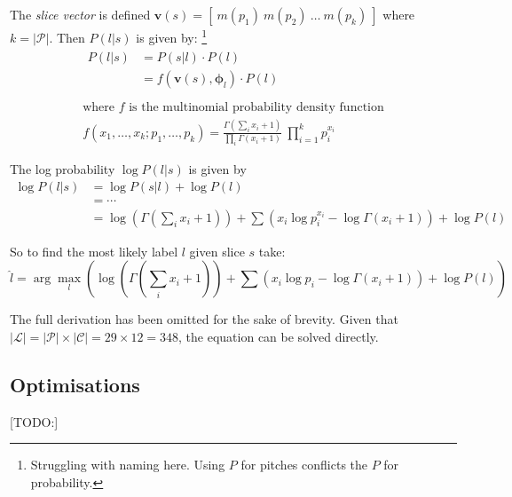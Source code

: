 \documentclass[12pt,a4paper,twoside,openany]{report} \usepackage[pdfborder={0 0 0}]{hyperref}    %
\theoremstyle{definition} \newtheorem{definition}{Definition}[section]
\begin{document}
      The \textit{slice vector} is defined $\bm{v}(s) = \left[~m(p_1)~ m(p_2)~\dots~m(p_{k})~\right]$ where $k
      = |\mathcal{P}|$. Then $P(l|s)$ is given by: \footnote{Struggling with naming here. Using $P$ for pitches
      conflicts the $P$ for probability.  } \begin{equation} \begin{gathered} \begin{aligned} P(l|s) &= P(s|l)\cdot P(l)
      \\ &= f(\bm{v}(s), \bm{\phi}_l)\cdot P(l) \\ \end{aligned} \\ \text{where $f$ is the multinomial probability
    density function} \\ f(x_1, \dots, x_k;p_1, \dots, p_k) = \frac{\Gamma \left(\sum\limits_{i} x_i
  + 1 \right)}{\prod\limits_{i} \Gamma \left(x_i + 1\right)}~\prod\limits_{i=1}^{k} p_{i}^{x_i} \end{gathered}
\label{eq:labelgivenchordtones} \end{equation}

The log probability $\log P(l|s)$ is given by \begin{equation} \begin{aligned} \log P(l|s) &= \log P(s|l) + \log P(l) \\
&= \cdots \\ &= \log \left(\Gamma\left(\sum\limits_{i} x_i + 1\right) \right) +  \sum\limits \left( x_i \log p_i^{x_i}
- \log \Gamma (x_i + 1) \right) +  \log P(l) \end{aligned} \label{eq:loglabelgivenchordtones} \end{equation}

So to find the most likely label $l$ given slice $s$ take: \begin{equation} \hat{l} = \arg\max_l \left(\log
\left(\Gamma\left(\sum\limits_{i} x_i + 1\right) \right) +  \sum\limits \left( x_i \log p_i - \log \Gamma (x_i + 1)
\right) +  \log P(l) \right) \label{eq:loglabsol} \end{equation}

The full derivation has been omitted for the sake of brevity. Given that $|\mathcal{L}| = |\mathcal{P}| \times
|\mathcal{C}| = 29 \times 12 = 348$, the equation can be solved directly. 

    \subsection{Optimisations}
    [TODO:]
\end{document}
